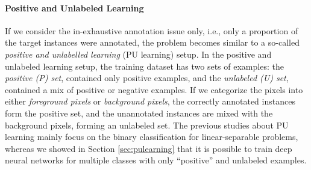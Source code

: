 \paragraph{Positive and Unlabeled Learning}
If we consider the in-exhaustive annotation issue only, i.e., only a proportion of the target instances were annotated, the problem becomes similar to a so-called \textit{positive and unlabelled learning} (PU learning) setup\cite{li2005learning}.
In the positive and unlabeled learning setup, the training dataset has two sets of examples: the \textit{positive (P) set}, contained only positive examples, and the \textit{unlabeled (U) set}, contained a mix of positive or negative examples.
If we categorize the pixels into either \textit{foreground pixels} or \textit{background pixels}, the correctly annotated instances form the positive set, and the unannotated instances are mixed with the background pixels, forming an unlabeled set.
The previous studies about PU learning mainly focus on the binary classification for linear-separable problems\cite{elkan2008learning,lee2003learning}, whereas we showed in Section \ref{sec:pulearning} that it is possible to train deep neural networks for multiple classes with only ``positive'' and unlabeled examples.
